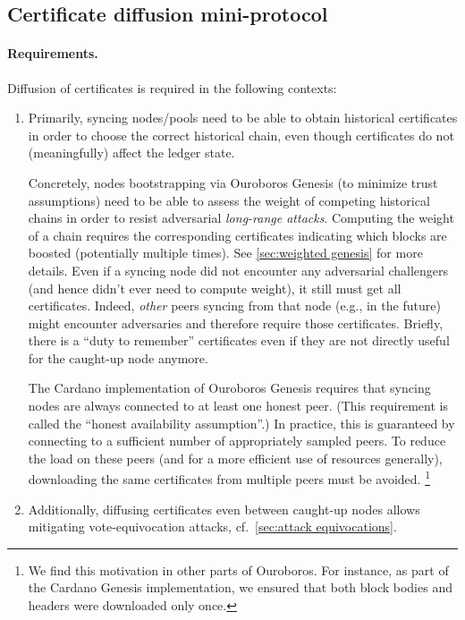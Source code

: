 \subsection{Certificate diffusion mini-protocol}%
\label{sec:certificate-diffusion}

\paragraph{Requirements.}

Diffusion of certificates is required in the following contexts:

\begin{enumerate}
\item
  Primarily, syncing nodes/pools need to be able to obtain historical certificates in order to choose the correct historical chain, even though certificates do not (meaningfully) affect the ledger state.

  Concretely, nodes bootstrapping via Ouroboros Genesis (to minimize trust assumptions) need to be able to assess the weight of competing historical chains in order to resist adversarial \emph{long-range attacks}.
  Computing the weight of a chain requires the corresponding certificates indicating which blocks are boosted (potentially multiple times).
  See \cref{sec:weighted genesis} for more details.
  Even if a syncing node did not encounter any adversarial challengers (and hence didn't ever need to compute weight), it still must get all certificates. Indeed, \emph{other} peers syncing from that node (e.g., in the future) might encounter adversaries and therefore require those certificates.
  Briefly, there is a \enquote{duty to remember} certificates even if they are not directly useful for the caught-up node anymore.

  The Cardano implementation of Ouroboros Genesis \parencite{genesis-implementation-documentation} requires that syncing nodes are always connected to at least one honest peer.
  (This requirement is called the “honest availability assumption”.)
  In practice, this is guaranteed by connecting to a sufficient number of appropriately sampled peers.
  To reduce the load on these peers (and for a more efficient use of resources generally), downloading the same certificates from multiple peers must be avoided.%
%
\footnote{We find this motivation in other parts of Ouroboros. For instance, as part of the Cardano Genesis implementation, we ensured that both block bodies and headers were downloaded only once.\cite{genesis-implementation-documentation}}
\item
  Additionally, diffusing certificates even between caught-up nodes allows mitigating vote-equivocation attacks, cf.~\cref{sec:attack equivocations}.
\end{enumerate}

